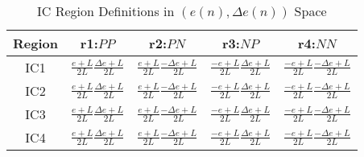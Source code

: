\begin{table}[h!]
\centering
\caption{IC Region Definitions in $(e(n), \Delta e(n))$ Space}
\begin{tabular}{ccccc}
\toprule
Region & r1:$PP$ & r2:$PN$ & r3:$NP$ &r4:$NN$\\
\midrule
IC1 & $\frac{e+L}{2L}\frac{\Delta e+L}{2L}$ & $\frac{e+L}{2L}\frac{-\Delta e+L}{2L}$& $\frac{-e+L}{2L}\frac{\Delta e+L}{2L}$& $\frac{-e+L}{2L}\frac{-\Delta e+L}{2L}$\\
IC2 & $\frac{e+L}{2L}\frac{\Delta e+L}{2L}$ & $\frac{e+L}{2L}\frac{-\Delta e+L}{2L}$& $\frac{-e+L}{2L}\frac{\Delta e+L}{2L}$& $\frac{-e+L}{2L}\frac{-\Delta e+L}{2L}$\\
IC3 & $\frac{e+L}{2L}\frac{\Delta e+L}{2L}$ & $\frac{e+L}{2L}\frac{-\Delta e+L}{2L}$& $\frac{-e+L}{2L}\frac{\Delta e+L}{2L}$& $\frac{-e+L}{2L}\frac{-\Delta e+L}{2L}$\\
IC4 & $\frac{e+L}{2L}\frac{\Delta e+L}{2L}$ & $\frac{e+L}{2L}\frac{-\Delta e+L}{2L}$& $\frac{-e+L}{2L}\frac{\Delta e+L}{2L}$& $\frac{-e+L}{2L}\frac{-\Delta e+L}{2L}$\\
\bottomrule
\end{tabular}
\end{table}